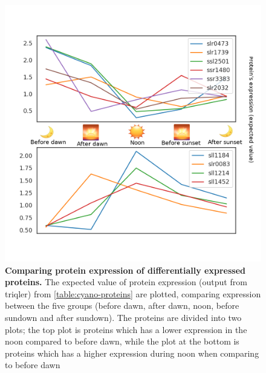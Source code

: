 \begin{figure}[H]
  \includegraphics[width=\linewidth]{results/combined_edited.png}
  \caption{\textbf{Comparing protein expression of differentially expressed proteins.} The expected value of protein expression (output from triqler) from \ref{table:cyano-proteins} are plotted, comparing expression between the five groups (before dawn, after dawn, noon, before sundown and after sundown). The proteins are divided into two plots; the top plot is proteins which has a lower expression in the noon compared to before dawn, while the plot at the bottom is proteins which has a higher expression during noon when comparing to before dawn}
  \label{fig:heatmap}
\end{figure}
